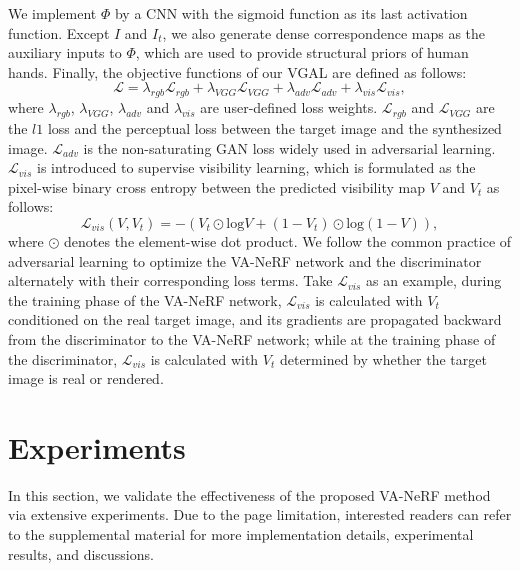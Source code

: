 \documentclass[letterpaper]{article} %
\begin{document}
We implement $\Phi$ by a CNN with the sigmoid function as its last activation function. Except $I$ and $I_t$, we also generate dense correspondence maps \cite{guler2018densepose} as the auxiliary inputs to $\Phi$, which are used to provide structural priors of human hands. Finally, the objective functions of our VGAL are defined as follows:
\begin{equation}
\mathcal{L}=\lambda_{rgb}\mathcal{L}_{rgb}+\lambda_{VGG}\mathcal{L}_{VGG}+\lambda_{adv}\mathcal{L}_{adv}+\lambda_{vis}\mathcal{L}_{vis},
\label{eq:loss}
\end{equation}
where $\lambda_{rgb}$, $\lambda_{VGG}$, $\lambda_{adv}$ and $\lambda_{vis}$ are user-defined loss weights. $\mathcal{L}_{rgb}$ and $\mathcal{L}_{VGG}$ are the $l1$ loss and the perceptual loss \cite{johnson2016perceptual} between the target image and the synthesized image. $\mathcal{L}_{adv}$ is the non-saturating GAN loss \cite{mescheder2018training,hong2022eva3d} widely used in adversarial learning. $\mathcal{L}_{vis}$ is introduced to supervise visibility learning, which is formulated as the pixel-wise binary cross entropy between the predicted visibility map $V$ and $V_t$ as follows:
\begin{equation}
    \mathcal{L}_{vis}(V, V_{t}) = - (V_{t} \odot \mathrm{log}V + (1-V_{t}) \odot \mathrm{log}(1 - V)),
    \label{eq:vis_loss}
\end{equation}
where $\odot$ denotes the element-wise dot product. We follow the common practice of adversarial learning \cite{mescheder2018training} to optimize the VA-NeRF network and the discriminator alternately with their corresponding loss terms. Take $\mathcal{L}_{vis}$ as an example, during the training phase of the VA-NeRF network, $\mathcal{L}_{vis}$ is calculated with $V_t$ conditioned on the real target image, and its gradients are propagated backward from the discriminator to the VA-NeRF network; while at the training phase of the discriminator, $\mathcal{L}_{vis}$ is calculated with $V_t$ determined by whether the target image is real or rendered.





\section{Experiments}

In this section, we validate the effectiveness of the proposed VA-NeRF method via extensive experiments. Due to the page limitation, interested readers can refer to the supplemental material for more implementation details, experimental results, and discussions.
\end{document}
